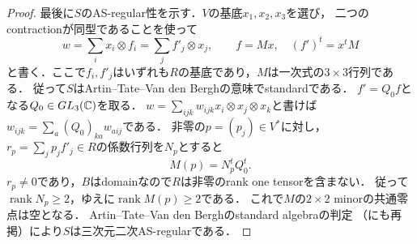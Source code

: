 \documentclass[11pt,a4paper]{ltjsarticle}
\begin{document}
\begin{proof}
最後に$S$のAS-regular性を示す．$V$の基底$x_1,x_2,x_3$を選び，
二つのcontractionが同型であることを使って
\[
 w=\sum_i x_i\otimes f_i=\sum_j f'_j\otimes x_j,
 \qquad f=Mx,\quad (f')^t=x^tM
\]
と書く．ここで$f_i,f'_j$はいずれも$R$の基底であり，$M$は一次式の$3\times3$行列である．
従って$S$はArtin--Tate--Van den Berghの意味でstandardである．
$f'=Q_0f$となる$Q_0\in GL_3(\mathbb C)$を取る．
$w=\sum_{ijk}w_{ijk}x_i\otimes x_j\otimes x_k$と書けば
$w_{ijk}=\sum_a(Q_0)_{ka}w_{aij}$である．
非零の$p=(p_j)\in V^*$に対し，
$r_p=\sum_jp_jf'_j\in R$の係数行列を$N_p$とすると
\[
 M(p)=N_p^tQ_0^t.
\]
$r_p\ne0$であり，$B$はdomainなので$R$は非零のrank one tensorを含まない．
従って$\operatorname{rank}N_p\geq2$，ゆえに$\operatorname{rank}M(p)\geq2$である．
これで$M$の$2\times2$ minorの共通零点は空となる．
Artin--Tate--Van den Berghのstandard algebraの判定
\cite[Theorem 1]{ATV1990}（\cite[Theorem 2.2]{IM}にも再掲）により$S$は三次元二次AS-regularである．
\end{proof}
\end{document}
